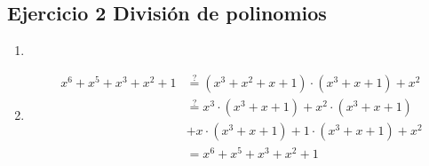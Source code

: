 \documentclass[11pt,fleqn]{article}
\begin{document}
\subsection*{Ejercicio 2 División de polinomios}
\begin{enumerate}[label=\alph*)]
\item {}

\EIIa

\item {}
\begin{align*}
    x^6+x^5+x^3+x^2+1
    &\overset{?}{=}(x^3+x^2+x+1)\cdot (x^3+x+1)+x^2\\
    &\overset{?}{=}x^3\cdot (x^3+x+1)+x^2\cdot (x^3+x+1)\\
    &+x\cdot (x^3+x+1)+1\cdot (x^3+x+1)+x^2\\
    &=x^6+x^5+x^3+x^2+1
\end{align*}

\end{enumerate}
\end{document}

